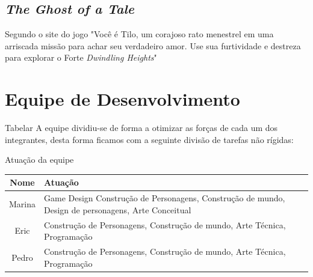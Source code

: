 \subsection{\textit{The Ghost of a Tale}}
Segundo o site do jogo  "Você é Tilo, um corajoso rato menestrel em uma arriscada missão para achar seu verdadeiro amor. Use sua furtividade e destreza para explorar o Forte \textit{Dwindling Heights}"


\section{Equipe de Desenvolvimento}
Tabelar
A equipe dividiu-se de forma a otimizar as forças de cada um dos integrantes, desta forma ficamos com a seguinte divisão de tarefas não rígidas:

\begin{quadro}[htb]
\caption{\label{quadro_atuacao}Atuação da equipe}
\begin{tabularx}{\textwidth}{|c|X|}
	\hline
	\textbf{Nome} & \textbf{Atuação}\\ \hline
    Marina & Game Design Construção de Personagens, Construção de mundo, Design de personagens, Arte Conceitual \\ \hline
    Eric   & Construção de Personagens, Construção de mundo, Arte Técnica, Programação                                        \\ \hline
    Pedro  & Construção de Personagens, Construção de mundo, Arte Técnica, Programação \\ \hline
\end{tabularx}
\end{quadro}